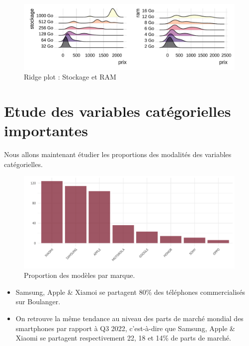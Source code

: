 \documentclass[
  12pt,
]{report}
\begin{document}
\begin{figure}[H]

{\centering \includegraphics{report_files/figure-pdf/ggplots-1.pdf}

}

\caption{Ridge plot : Stockage et RAM}

\end{figure}%

\newpage

\section{Etude des variables catégorielles
importantes}\label{etude-des-variables-catuxe9gorielles-importantes}

Nous allons maintenant étudier les proportions des modalités des
variables catégorielles.

\begin{figure}[H]

{\centering \includegraphics{report_files/figure-pdf/brand_prop-1.pdf}

}

\caption{Proportion des modèles par marque.}

\end{figure}%

\begin{itemize}
\item
  Samsung, Apple \& Xiamoi se partagent 80\% des téléphones
  commercialisés sur Boulanger.
\item
  On retrouve la même tendance au niveau des parts de marché mondial des
  smartphones par rapport à Q3 2022, c'est-à-dire que Samsung, Apple \&
  Xiaomi se partagent respectivement 22, 18 et 14\% de parts de marché.
\end{itemize}
\end{document}
